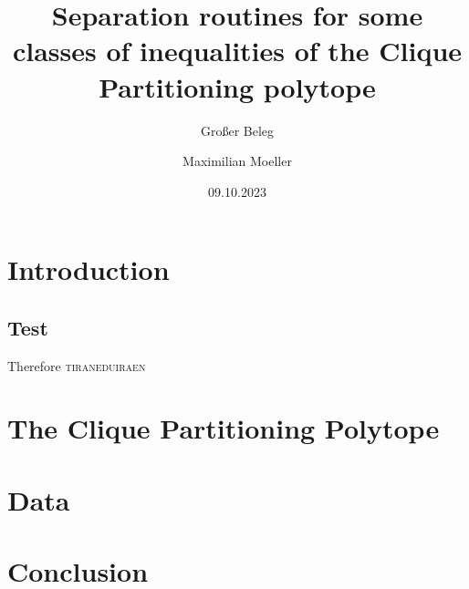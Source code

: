 \documentclass[a4paper, cd=full, cdtitle=on, cdfont=off, cdsection=false]{tudscrartcl}
\institute{Institut für Künstliche Intelligenz}
\date{09.10.2023}
\title{Separation routines for some classes of inequalities of the Clique Partitioning polytope}
\subtitle{Großer Beleg}
\author{Maximilian Moeller}
\begin{document}

\maketitle

\newpage
\tableofcontents
\newpage

\section{Introduction}
\subsection{Test}
\blindtext
Therefore \cite{andresPolyhedralStudyLifted2023a}
\textsc{tiraneduiraen}

\section{The Clique Partitioning Polytope}

\section{Data}
\section{Conclusion}

\newpage
\printbibliography
\end{document}
